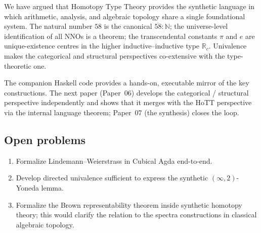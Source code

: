 \documentclass[12pt]{article}
\theoremstyle{definition}
\theoremstyle{remark}
\newcommand{\N}{\mathbb{N}}
\newcommand{\R}{\mathbb{R}}
\begin{document}
We have argued that Homotopy Type Theory provides the synthetic language
in which arithmetic, analysis, and algebraic topology share a single
foundational system. The natural number $58$ is the canonical
$\overline{58} : \N$; the universe-level identification of all NNOs is a
theorem; the transcendental constants $\pi$ and $e$ are unique-existence
centres in the higher inductive--inductive type $\R_c$. Univalence makes
the categorical and structural perspectives co-extensive with the
type-theoretic one.

The companion Haskell code provides a hands-on, executable mirror of the
key constructions. The next paper (Paper~06) develops the categorical /
structural perspective independently and shows that it merges with the
HoTT perspective via the internal language theorem; Paper~07 (the
synthesis) closes the loop.

\subsection{Open problems}

\begin{enumerate}
\item Formalize Lindemann--Weierstrass in Cubical Agda end-to-end.
\item Develop directed univalence sufficient to express the synthetic
$(\infty, 2)$-Yoneda lemma.
\item Formalize the Brown representability theorem inside synthetic
homotopy theory; this would clarify the relation to the spectra
constructions in classical algebraic topology.
\end{enumerate}
\end{document}
